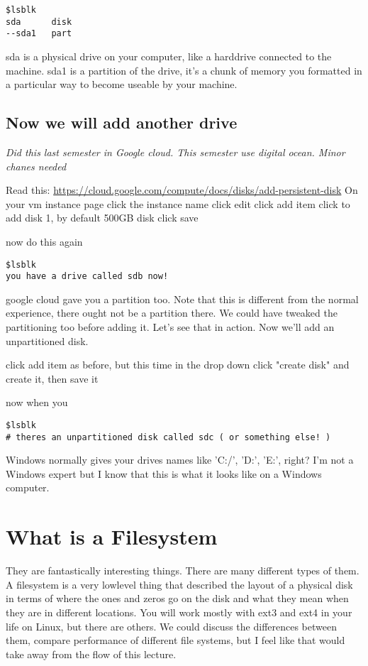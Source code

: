 \documentclass[10pt]{article}
\begin{document}
\begin{lstlisting}
$lsblk
sda      disk
--sda1   part
\end{lstlisting}

sda is a physical drive on your computer, like a harddrive connected to the machine. sda1 is a partition of the drive, it's a chunk of memory you 
formatted in a particular way to become useable by your machine.

\subsection{ Now we will add another drive}

\textit{Did this last semester in Google cloud. This semester use digital ocean. Minor chanes needed}

Read this: \url{https://cloud.google.com/compute/docs/disks/add-persistent-disk}
On your vm instance page click the instance name
click edit
click add item
click to add disk 1, by default 500GB disk
click save

now do this again

\begin{lstlisting}
$lsblk
you have a drive called sdb now!
\end{lstlisting}

google cloud gave you a partition too. Note that this is different from the normal experience, there ought not be a partition there. We could have tweaked the partitioning too before adding it. Let's see that in action. Now we'll add an unpartitioned disk.

click add item as before, but this time in the drop down click "create disk" and create it, then save it 

now when you 

\begin{lstlisting}
$lsblk
# theres an unpartitioned disk called sdc ( or something else! )
\end{lstlisting}

Windows normally gives your drives names like 'C:/', 'D:', 'E:', right? I'm not a Windows expert but I know that this is what it looks like on a Windows computer.


\section{What is a Filesystem}
They are fantastically interesting things. There are many different types of them. A filesystem is a very lowlevel thing that described the layout of a physical disk in terms of where the ones and zeros go on the disk and what they mean when they are in different locations. You will work mostly with ext3 and ext4 in your life on Linux, but there are others. We could discuss the differences between them, compare performance of different file systems, but I feel like that would take away from the flow of this lecture. 
\end{document}
